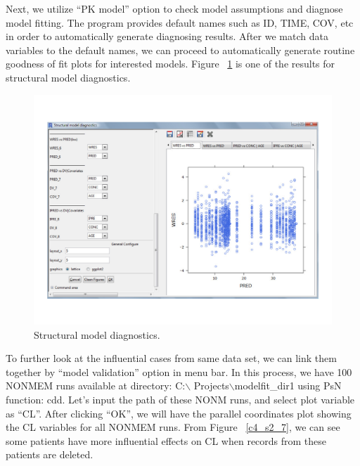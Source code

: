 \documentclass[a4paper]{article}
\begin{document}
Next, we utilize ``PK model'' option to check model assumptions and diagnose model fitting. The program provides default names such as ID, TIME, COV, etc in order to automatically generate diagnosing results. After we match data variables to the default names, we can proceed to automatically generate routine goodness of fit plots for interested models. Figure ~\ref{c4_s2_6} is one of the results for structural model diagnostics.
\begin{figure}[h!tb]
\centering
\includegraphics[scale=0.6]{c4_s2_6.pdf}
\caption{Structural model diagnostics.}
\label{c4_s2_6}
\end{figure}
\newline
\newline
To further look at the influential cases from same data set, we can link them together by ``model validation'' option in menu bar. In this process, we have 100 NONMEM runs available at directory: C:$\backslash$ Projects$\backslash$modelfit\_dir1 using PsN function: cdd. Let's input the path of these NONM runs, and select plot variable as ``CL''. After clicking ``OK'', we will have the parallel coordinates plot showing the CL variables for all NONMEM runs. From Figure ~\ref{c4_s2_7}, we can see some patients have more influential effects on CL when records from these patients are deleted.
\end{document}
